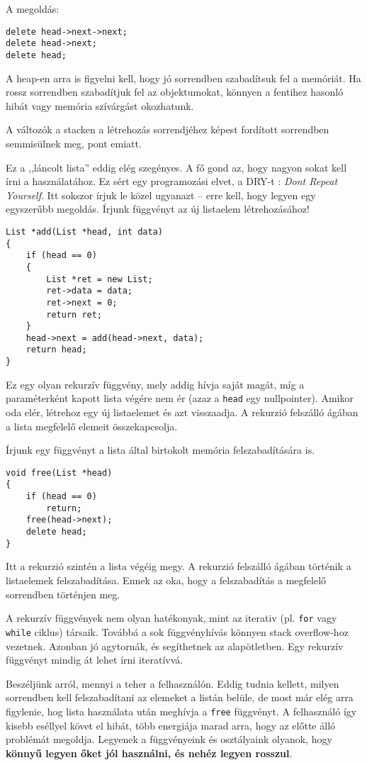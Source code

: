 \documentclass[../cpp_book/cpp_book.tex]{subfiles}
\begin{document}
	A megoldás:
	\begin{lstlisting}
delete head->next->next;
delete head->next;
delete head;
	\end{lstlisting}
	\begin{note}
		A heap-en arra is figyelni kell, hogy jó sorrendben szabadítsuk fel a memóriát. Ha rossz sorrendben szabadítjuk fel az objektumokat, könnyen a fentihez hasonló hibát vagy memória szívárgást okozhatunk.
	\end{note}
	A változók a stacken a létrehozás sorrendjéhez képest fordított sorrendben semmisülnek meg, pont emiatt.
	\medskip
	
	Ez a ,,láncolt lista'' eddig elég szegényes. A fő gond az, hogy nagyon sokat kell írni a használatához. Ez sért egy programozási elvet, a DRY-t : \textit{Dont Repeat Yourself}. Itt sokszor írjuk le közel ugyanazt -- erre kell, hogy legyen egy egyszerűbb megoldás. Írjunk függvényt az új listaelem létrehozásához!
	\begin{lstlisting}
List *add(List *head, int data)
{
	if (head == 0)
	{
		List *ret = new List;
		ret->data = data;
		ret->next = 0;
		return ret;
	}
	head->next = add(head->next, data);
	return head;
}
	\end{lstlisting}
	Ez egy olyan rekurzív függvény, mely addig hívja saját magát, míg a paraméterként kapott lista végére nem ér (azaz a \texttt{head} egy nullpointer). Amikor oda elér, létrehoz egy új listaelemet és azt visszaadja. A rekurzió felszálló ágában a lista megfelelő elemeit összekapcsolja. 
	\medskip
	
	Írjunk egy függvényt a lista által birtokolt memória felszabadítására is.
	\begin{lstlisting}
void free(List *head)
{
	if (head == 0)
		return;
	free(head->next);
	delete head;
}
	\end{lstlisting}
	Itt a rekurzió szintén a lista végéig megy. A rekurzió felszálló ágában történik a listaelemek felszabadítása. Ennek az oka, hogy a felszabadítás a megfelelő sorrendben történjen meg.
	\begin{note}
		A rekurzív függvények nem olyan hatékonyak, mint az iterativ (pl. \texttt{for} vagy \texttt{while} ciklus) társaik. Továbbá a sok függvényhívás könnyen stack overflow-hoz vezetnek. Azonban jó agytornák, és segíthetnek az alapötletben. Egy rekurzív függvényt mindig át lehet írni iteratívvá.
	\end{note}
	Beszéljünk arról, mennyi a teher a felhasználón. Eddig tudnia kellett, milyen sorrendben kell felszabadítani az elemeket a listán belüle, de most már elég arra figylenie, hog lista használata után meghívja a \texttt{free} függvényt. A felhasználó így kisebb eséllyel követ el hibát, több energiája marad arra, hogy az előtte álló problémát megoldja. Legyenek a függvényeink és osztályaink olyanok, hogy \textbf{könnyű legyen őket jól használni, és nehéz legyen rosszul}.
	
\end{document}
